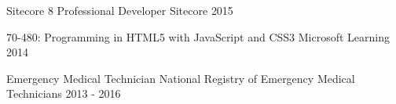 

\begin{cvhonors}

  \cvhonor
    {Sitecore 8 Professional Developer} %
    {Sitecore} %
    {}
    {2015} %

  \cvhonor
    {70-480: Programming in HTML5 with JavaScript and CSS3} %
    {Microsoft Learning} %
    {}
    {2014} %

\cvhonor
	{Emergency Medical Technician}
	{National Registry of Emergency Medical Technicians}
	{}
	{2013 - 2016}
\end{cvhonors}
